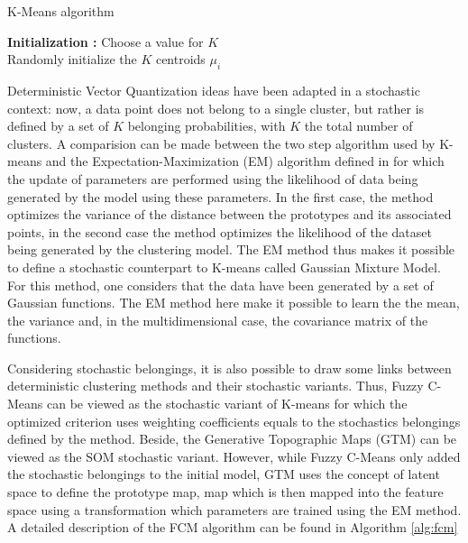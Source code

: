 \documentclass[a4paper]{report}
\begin{document}
    \begin{algorithm}
        \caption{K-Means algorithm}
        \label{alg:kmeans}
        \textbf{Initialization :} Choose a value for $K$\\
        Randomly initialize the $K$ centroids $\mu_i$\\
    \end{algorithm}

    Deterministic Vector Quantization ideas have been adapted in a stochastic context: now, a data point does not belong to a single cluster, but rather is defined by a set of $K$ belonging probabilities, with $K$ the total number of clusters. A comparision can be made between the two step algorithm used by K-means and the Expectation-Maximization (EM) algorithm defined in \cite{dempster1977maximum} for which the update of parameters are performed using the likelihood of data being generated by the model using these parameters. In the first case, the method optimizes the variance of the distance between the prototypes and its associated points, in the second case the method optimizes the likelihood of the dataset being generated by the clustering model. The EM method thus makes it possible to define a stochastic counterpart to K-means called Gaussian Mixture Model. For this method, one considers that the data have been generated by a set of Gaussian functions. The EM method here make it possible to learn the the mean, the variance and, in the multidimensional case, the covariance matrix of the functions.
    
    Considering stochastic belongings, it is also possible to draw some links between deterministic clustering methods and their stochastic variants. Thus, Fuzzy C-Means \cite{bezdek1984fcm} can be viewed as the stochastic variant of K-means for which the optimized criterion uses weighting coefficients equals to the stochastics belongings defined by the method. Beside, the Generative Topographic Maps (GTM) \cite{bishop1998gtm} can be viewed as the SOM stochastic variant. However, while Fuzzy C-Means only added the stochastic belongings to the initial model, GTM uses the concept of latent space to define the prototype map, map which is then mapped into the feature space using a transformation which parameters are trained using the EM method. A detailed description of the FCM algorithm can be found in Algorithm \ref{alg:fcm}
    
\end{document}
